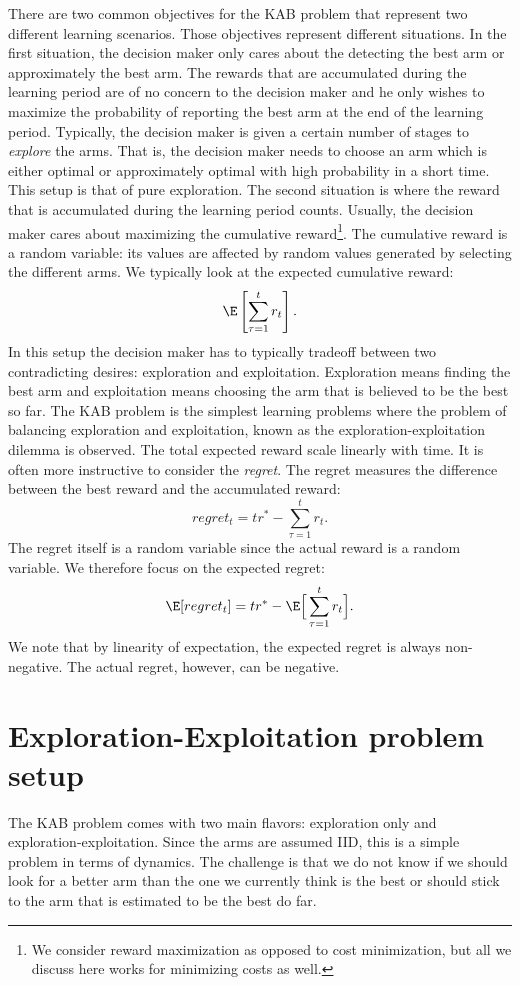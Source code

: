 There are two common objectives for the KAB problem that represent two different learning scenarios. Those objectives represent different situations. In the first situation, the decision maker only cares about the detecting the best arm or approximately the best arm. The rewards that are accumulated during the learning period are of no concern to the decision maker and he only wishes to maximize the probability of reporting the best arm at the end of the learning period.
Typically, the decision maker is given a certain number of stages to {\em explore} the arms. That is, the decision maker needs to choose an arm which is either optimal or approximately optimal with high probability in a short time. This setup is that of pure exploration.
The second situation is where the reward that is accumulated during the learning period counts. Usually, the decision maker cares about maximizing the cumulative reward\footnote{We consider reward maximization as opposed to cost minimization, but all we discuss here works for minimizing costs as well.}.
The cumulative reward is a random variable: its values are affected by random values generated by selecting the different arms. We typically look at the expected cumulative reward:
$$
 \E \left[ \sum_{\tau=1}^t r_t \right].
$$
In this setup the decision maker has to typically tradeoff between two contradicting desires:
exploration and exploitation. Exploration means finding the best arm and exploitation means choosing the arm that is
believed to be the best so far. The KAB problem is the simplest learning problems where the problem of balancing exploration and exploitation, known as the exploration-exploitation dilemma is observed.
The total expected reward scale linearly with time. It is often more instructive to consider the {\em regret}.
The regret measures the difference between the best reward and the accumulated reward:
$$
regret_t = t r^* - \sum_{\tau=1}^t r_t.
$$
The regret itself is a random variable since the actual reward is a random variable. We therefore focus on the expected regret:
$$
\E [regret_t] = t r^* - \E \Big[ \sum_{\tau=1}^t r_t \Big].
$$
We note that by linearity of expectation, the expected regret is always non-negative. The actual regret, however, can be negative.

\section{Exploration-Exploitation problem setup}

The KAB problem comes with two main flavors: exploration only and exploration-exploitation. Since the arms are assumed IID, this is a simple problem in terms of dynamics. The challenge is that we do not know if we should look for a better arm than the one we currently think is the best or should stick to the arm that is estimated to be the best do far.

